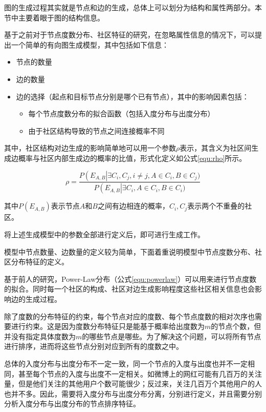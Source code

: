 图的生成过程其实就是节点和边的生成，总体上可以划分为结构和属性两部分。本节中主要着眼于图的结构信息。

基于之前对于节点度数分布、社区特征的研究，在忽略属性信息的情况下，可以提出一个简单的有向图生成模型，其中包括如下信息\cite{FastSGG}：

\begin{itemize}
    \item 节点的数量
    \item 边的数量
    \item 边的选择（起点和目标节点分别是哪个已有节点），其中的影响因素包括：
    \begin{itemize}
        \item 每个节点度数分布的拟合函数（包括入度分布与出度分布）
        \item 由于社区结构导致的节点之间连接概率不同
    \end{itemize}
\end{itemize}

\vspace{0.2cm}

其中，社区结构对边生成的影响简单地可以用一个参数$\rho$表示，其含义为社区间生成边概率与社区内部生成边的概率的比值，形式化定义如公式\ref{equ:rho}所示。

\begin{equation}[H]
    \label{equ:rho}
    \rho = \frac{P\left(E_{A,B}\right|\exists C_i, C_j, i\ne j, A\in C_i, B\in C_j)}{P\left(E_{A,B}\right|\exists C_i, A\in C_i, B\in C_i)}
\end{equation}

其中$P\left(E_{A,B}\right)$表示节点$A$和$B$之间有边相连的概率，$C_i, C_j$表示两个不重叠的社区。

将上述生成模型中的参数全部进行定义后，即可进行生成工作。

模型中节点数量、边数量的定义较为简单，下面着重说明模型中节点度数分布、社区分布特征的定义。

基于前人的研究，Power-Law分布（公式\ref{equ:powerlaw}）可以用来进行节点度数的拟合。同时每一个社区的构成、社区对边生成影响程度这些社区相关信息也会影响边的生成过程。

除了度数的分布特征的约束，每个节点对应的度数、每个节点度数的相对次序也需要进行约束。这是因为度数分布特征只是能基于概率给出度数为$m$的节点个数，但并没有指定具体度数为$m$的哪些节点是哪些。为了解决这个问题，可以将所有节点进行排序，进而将这些节点分别对应到所有的度数之中。

总体的入度分布与出度分布不一定一致，同一个节点的入度与出度也并不一定相同，甚至每个节点的入度与出度不一定相关。如微博上的网红可能有几百万的关注量，但是他们关注的其他用户个数可能很少；反过来，关注几百万个其他用户的人也并不多。因此，需要将入度分布与出度分布分离，分别进行定义，并且需要分别分析入度分布与出度分布的节点排序特征。

